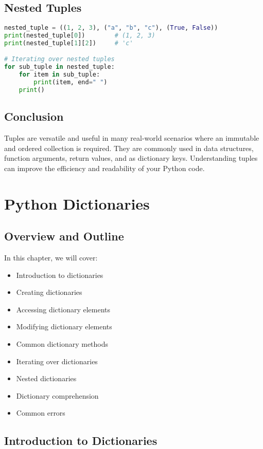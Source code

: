 \section{Nested Tuples}

\begin{lstlisting}[language=Python]
nested_tuple = ((1, 2, 3), ("a", "b", "c"), (True, False))
print(nested_tuple[0])        # (1, 2, 3)
print(nested_tuple[1][2])     # 'c'

# Iterating over nested tuples
for sub_tuple in nested_tuple:
    for item in sub_tuple:
        print(item, end=" ")
    print()
\end{lstlisting}

\section{Conclusion}

Tuples are versatile and useful in many real-world scenarios where an immutable and ordered collection is required.  
They are commonly used in data structures, function arguments, return values, and as dictionary keys.  
Understanding tuples can improve the efficiency and readability of your Python code.

\chapter{Python Dictionaries}

\section{Overview and Outline}

In this chapter, we will cover:
\begin{itemize}
    \item Introduction to dictionaries
    \item Creating dictionaries
    \item Accessing dictionary elements
    \item Modifying dictionary elements
    \item Common dictionary methods
    \item Iterating over dictionaries
    \item Nested dictionaries
    \item Dictionary comprehension
    \item Common errors
\end{itemize}

\section{Introduction to Dictionaries}

